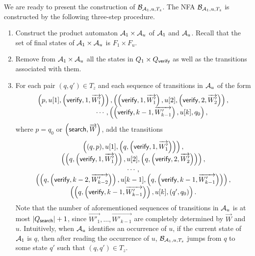 We are ready to present the construction of $\mathcal{B}_{\mathcal{A}_1, u,  T_{z}}$. The NFA $\mathcal{B}_{\mathcal{A}_1, u,  T_{z}}$ is constructed by the following three-step procedure.
\begin{enumerate}
\item Construct the product automaton $\mathcal{A}_1 \times \mathcal{A}_u$ of $\mathcal{A}_1$ and $\mathcal{A}_u$. Recall that the set of final states of $\mathcal{A}_1 \times \mathcal{A}_u$ is $F_1 \times F_u$. 

\item Remove from $\mathcal{A}_1 \times \mathcal{A}_u$ all the states in $Q_1 \times Q_{\mathsf{verify}}$ as well as the transitions associated with them.

\item For each pair $(q,q') \in T_{z}$ and each sequence of transitions in $\mathcal{A}_u$ of the form 
$$
\begin{array}{l}
\left(p, u[1], \left(\verify, 1, \overrightarrow{W'_1} \right) \right), \left( \left(\verify, 1, \overrightarrow{W'_1} \right), u[2], 
 \left(\verify, 2, \overrightarrow{W'_2}\right) \right), \\
 \hspace{3cm} \cdots, \left(\left(\verify, k-1, \overrightarrow{W'_{k-1}} \right), u[k], q_0\right),
\end{array}
$$ 
where  $p=q_0$ or $\left(\mathsf{search}, \overrightarrow{W} \right)$,
add the transitions
$$
\begin{array}{c}
\left((q,p), u[1], \left(q, \left(\mathsf{verify}, 1, \overrightarrow{W'_1} \right) \right) \right), \\
\left( \left(q, \left(\mathsf{verify}, 1, \overrightarrow{W'_1} \right) \right), u[2], \left(q, \left(\mathsf{verify}, 2, \overrightarrow{W'_2}\right)\right)\right),  \\
\cdots, \\
\left(\left(q, \left(\mathsf{verify}, k-2, \overrightarrow{W'_{k-2}} \right) \right), u[k-1], \left (q, \left (\mathsf{verify}, k-1, \overrightarrow{W'_{k-1}} \right) \right) \right),\\ \left( \left(q, \left (\mathsf{verify}, k-1, \overrightarrow{W'_{k-1}} \right) \right), u[k], \left(q', q_0 \right)\right).
\end{array}
$$
Note that the number of aforementioned sequences of transitions in $\mathcal{A}_u$ is at most $|Q_{\mathsf{search}}|+1$, since  $ \overrightarrow{W'_1},\dots,  \overrightarrow{W'_{k-1}}$ are completely determined by $\overrightarrow{W} $ and $u$.
Intuitively, when $\mathcal{A}_u$ identifies an occurrence of $u$, if the current state of $\mathcal{A}_1$ is $q$, then after reading the occurrence of $u$, $\mathcal{B}_{\mathcal{A}_1, u, T_z}$ jumps from $q$ to some state $q'$ such that $(q,q') \in T_z$.
\end{enumerate}

